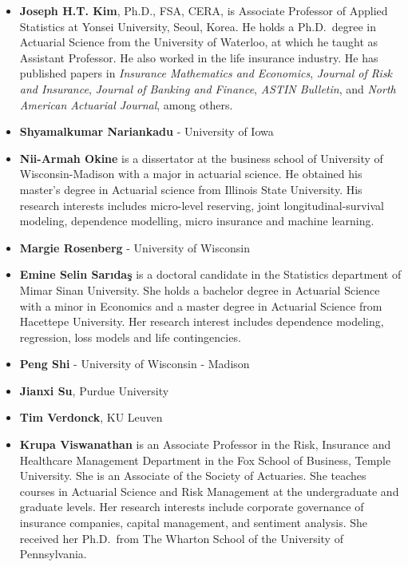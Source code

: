 \documentclass[]{book}
\providecommand{\tightlist}{%
  \setlength{\itemsep}{0pt}\setlength{\parskip}{0pt}}
\theoremstyle{definition}
\theoremstyle{definition}
\theoremstyle{definition}
\theoremstyle{remark}
\begin{document}
\begin{itemize}
\item
  \textbf{Joseph H.T. Kim}, Ph.D., FSA, CERA, is Associate Professor of
  Applied Statistics at Yonsei University, Seoul, Korea. He holds a
  Ph.D.~degree in Actuarial Science from the University of Waterloo, at
  which he taught as Assistant Professor. He also worked in the life
  insurance industry. He has published papers in \emph{Insurance
  Mathematics and Economics}, \emph{Journal of Risk and Insurance},
  \emph{Journal of Banking and Finance}, \emph{ASTIN Bulletin}, and
  \emph{North American Actuarial Journal}, among others.
\item
  \textbf{Shyamalkumar Nariankadu} - University of Iowa
\end{itemize}

\begin{itemize}
\item
  \textbf{Nii-Armah Okine} is a dissertator at the business school of
  University of Wisconsin-Madison with a major in actuarial science. He
  obtained his master's degree in Actuarial science from Illinois State
  University. His research interests includes micro-level reserving,
  joint longitudinal-survival modeling, dependence modelling, micro
  insurance and machine learning.
\item
  \textbf{Margie Rosenberg} - University of Wisconsin
\end{itemize}

\begin{itemize}
\item
  \textbf{Emine Selin Sarıdaş} is a doctoral candidate in the Statistics
  department of Mimar Sinan University. She holds a bachelor degree in
  Actuarial Science with a minor in Economics and a master degree in
  Actuarial Science from Hacettepe University. Her research interest
  includes dependence modeling, regression, loss models and life
  contingencies.
\item
  \textbf{Peng Shi} - University of Wisconsin - Madison
\item
  \textbf{Jianxi Su}, Purdue University
\item
  \textbf{Tim Verdonck}, KU Leuven
\end{itemize}

\begin{itemize}
\tightlist
\item
  \textbf{Krupa Viswanathan} is an Associate Professor in the Risk,
  Insurance and Healthcare Management Department in the Fox School of
  Business, Temple University. She is an Associate of the Society of
  Actuaries. She teaches courses in Actuarial Science and Risk
  Management at the undergraduate and graduate levels. Her research
  interests include corporate governance of insurance companies, capital
  management, and sentiment analysis. She received her Ph.D.~from The
  Wharton School of the University of Pennsylvania.
\end{itemize}
\end{document}
